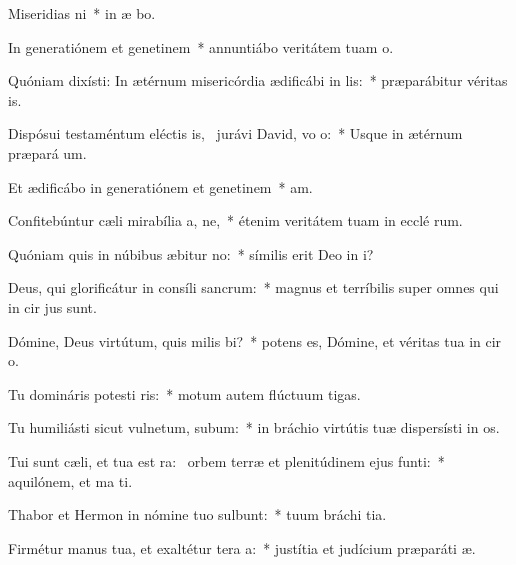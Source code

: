 \item Miseridias ni~* in æ bo.
\item In generatiónem et genetinem~* annuntiábo veritátem tuam   o.
\item Quóniam dixísti: In ætérnum misericórdia ædificábi in lis:~* præparábitur véritas   is.
\item Dispósui testaméntum eléctis is,~\pscross{} jurávi David, vo o:~* Usque in ætérnum præpará  um.
\item Et ædificábo in generatiónem et genetinem~*  am.
\item Confitebúntur cæli mirabília a, ne,~* étenim veritátem tuam in ecclé rum.
\item Quóniam quis in núbibus æbitur no:~* símilis erit Deo in  i?
\item Deus, qui glorificátur in consíli sancrum:~* magnus et terríbilis super omnes qui in cir jus sunt.
\item Dómine, Deus virtútum, quis milis bi?~* potens es, Dómine, et véritas tua in cir o.
\item Tu domináris potesti ris:~* motum autem flúctuum   tigas.
\item Tu humiliásti sicut vulnetum, subum:~* in bráchio virtútis tuæ dispersísti in os.
\item Tui sunt cæli, et tua est ra:~\pscross{} orbem terræ et plenitúdinem ejus  funti:~* aquilónem, et ma  ti.
\item Thabor et Hermon in nómine tuo sulbunt:~* tuum bráchi  tia.
\item Firmétur manus tua, et exaltétur tera a:~* justítia et judícium præparáti  æ.
